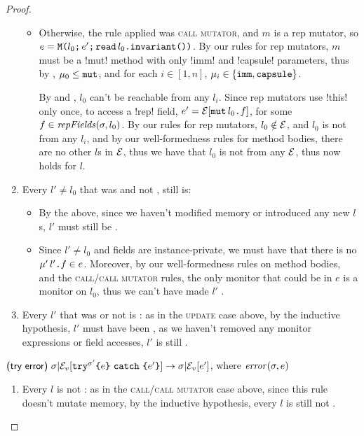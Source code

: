 \begin{proof}
\begin{ienumerate}
\begin{enumerate}
\begin{itemize}
			\item Otherwise, the rule applied was \textsc{call mutator}, and $m$ is a rep mutator, so $e = \texttt{M}\texttt{(}{}l_0\texttt{;}\,e'\texttt{;}\,\texttt{read}\,l_0\texttt{.} \texttt{invariant}\texttt{(}\texttt{)}\texttt{)}$.
				By our rules for rep mutators, $m$ must be a \Q!mut! method with only \Q!imm! and \Q!capsule! parameters, thus by , 
				$\mu_0 \leq \texttt{mut}$, and for each $i \in [1, n]$, $\mu_i \in \{\texttt{imm},\texttt{capsule}\}$. 
					
				By  and , $l_0$ can't be reachable from any $l_i$. Since rep mutators use \Q!this! only once, to access a \Q!rep! field, $e' = \mathcal{E}[\texttt{mut}\,l_0\texttt{.} f]$, for some $f \in \mathit{repFields}(\sigma, l_0)$. 
				By our rules for rep mutators, $l_0 \notin \mathcal{E}$, and $l_0$ is not \reach from any $l_i$, and by our well-formedness rules for method bodies, 
				there are no other $l$s in $\mathcal{E}$, thus we have that $l_0$ is not \reach from any $\mathcal{E}$, thus \HNO now holds for $l$.
		\end{itemize}

		\item Every $l' \neq l_0$ that was \RCN and not \RM, still is:
		\begin{itemize}
			\item By the above, since we haven't modified memory or introduced any new $l$s, $l'$ must still be \RCN.
			\item Since $l' \neq l_0$ and fields are instance-private, we must have that there is no $\mu'\,l'\texttt{.} f \in e$.
				Moreover, by our well-formedness rules on method bodies, and the \textsc{call/call mutator} rules, the only monitor that could be in $e$ is a monitor on $l_0$, thus we can't have made $l'$ \RM.
		\end{itemize}
		

		\item Every \reach $l'$ that was \RM or not \RCN is \HNO:
			as in the \textsc{update} case above, by the inductive hypothesis, $l'$ must have been \HNO, as we haven't removed any monitor expressions or field accesses, $l'$ is still \HNO.
	\end{enumerate}

	\item $\textsf{(try error)}\ \sigma|\mathcal{E}_v{}[\texttt{try}^{\sigma'}\texttt{\{} e\texttt{\}}\ \texttt{catch}\ \texttt{\{} e'\texttt{\}}] \rightarrow \sigma|\mathcal{E}_v{}[e']$, where $\mathit{error}(\sigma, e)$
	\begin{enumerate}
		\item Every \reach $l$ is not \RCR:
			as in the \textsc{call/call mutator} case above, since this rule doesn't mutate memory, by the inductive hypothesis, every \reach $l$ is still not \RCR.
	

\end{enumerate}
\end{ienumerate}
\end{proof}
